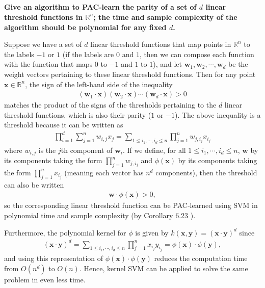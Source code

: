 \documentclass[a4paper,12pt]{article}
\theoremstyle{remark}
\newcommand{\bs}{\boldsymbol}
\begin{document}
\subsection{}
    \boldmath\textbf{Give an algorithm to PAC-learn the parity of a set of $d$ linear threshold functions in $\mathbb{R}^n$; the time and sample complexity of the algorithm should be polynomial for any fixed $d$.
    }\unboldmath \par
    Suppose we have a set of $d$ linear threshold functions that map points in $\mathbb{R}^n$ to the labels $-1$ or $1$ (if the labels are $0$ and $1$, then we can compose each function with the function that maps $0$ to $-1$ and $1$ to $1$), and let $\bs{w}_1, \bs{w}_2, \cdots, \bs{w}_d$ be the weight vectors pertaining to these linear threshold functions. Then for any point $\bs{x} \in \mathbb{R}^n$, the sign of the left-hand side of the inequality
    \begin{align*}
        (\bs{w}_1 \cdot \bs{x})(\bs{w}_2 \cdot \bs{x}) \cdots (\bs{w}_d \cdot \bs{x}) > 0
    \end{align*}
    matches the product of the signs of the thresholds pertaining to the $d$ linear threshold functions, which is also their parity ($1$ or $-1$). The above inequality is a threshold because it can be written as
    \begin{align*}
        \prod_{i = 1}^d \sum_{j = 1}^n w_{i, j} x_j = \sum_{1 \leq i_1, \cdots, i_d \leq n} \prod_{j = 1}^n w_{j, i_j} x_{i_j}
    \end{align*}
    where $w_{i, j}$ is the $j$th component of $\bs{w}_i$. If we define, for all $1 \leq i_1, \cdots, i_d \leq n$, $\bs{w}$ by its components taking the form $\prod_{j = 1}^n w_{j, i_j}$ and $\phi(\bs{x})$ by its components taking the form $\prod_{j = 1}^n x_{i_j}$ (meaning each vector has $n^d$ components), then the threshold can also be written
    \begin{align*}
        \bs{w} \cdot \phi(\bs{x}) > 0,
    \end{align*}
    so the corresponding linear threshold function can be PAC-learned using SVM in polynomial time and sample complexity (by Corollary 6.23 \cite{blum}). \par
    Furthermore, the polynomial kernel for $\phi$ is given by $k(\bs{x}, \bs{y}) = (\bs{x} \cdot \bs{y})^d$ since
    \begin{align*}
        (\bs{x} \cdot \bs{y})^d = \sum_{1 \leq i_1, \cdots, i_d \leq n} \prod_{j = 1}^n x_{i_j} y_{i_j} = \phi(\bs{x}) \cdot \phi(\bs{y}),
    \end{align*}
    and using this representation of $\phi(\bs{x}) \cdot \phi(\bs{y})$ reduces the computation time from $O(n^d)$ to $O(n)$. Hence, kernel SVM can be applied to solve the same problem in even less time.
\end{document}
